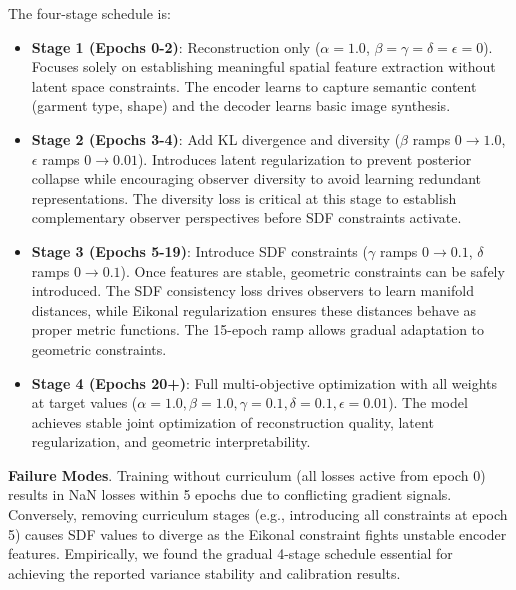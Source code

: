 \documentclass[10pt,twocolumn,letterpaper]{article}
\begin{document}
The four-stage schedule is:

\begin{itemize}
    \item \textbf{Stage 1 (Epochs 0-2)}: Reconstruction only ($\alpha=1.0$, $\beta=\gamma=\delta=\epsilon=0$). Focuses solely on establishing meaningful spatial feature extraction without latent space constraints. The encoder learns to capture semantic content (garment type, shape) and the decoder learns basic image synthesis.

    \item \textbf{Stage 2 (Epochs 3-4)}: Add KL divergence and diversity ($\beta$ ramps $0 \to 1.0$, $\epsilon$ ramps $0 \to 0.01$). Introduces latent regularization to prevent posterior collapse while encouraging observer diversity to avoid learning redundant representations. The diversity loss is critical at this stage to establish complementary observer perspectives before SDF constraints activate.

    \item \textbf{Stage 3 (Epochs 5-19)}: Introduce SDF constraints ($\gamma$ ramps $0 \to 0.1$, $\delta$ ramps $0 \to 0.1$). Once features are stable, geometric constraints can be safely introduced. The SDF consistency loss drives observers to learn manifold distances, while Eikonal regularization ensures these distances behave as proper metric functions. The 15-epoch ramp allows gradual adaptation to geometric constraints.

    \item \textbf{Stage 4 (Epochs 20+)}: Full multi-objective optimization with all weights at target values ($\alpha=1.0, \beta=1.0, \gamma=0.1, \delta=0.1, \epsilon=0.01$). The model achieves stable joint optimization of reconstruction quality, latent regularization, and geometric interpretability.
\end{itemize}

\textbf{Failure Modes}. Training without curriculum (all losses active from epoch 0) results in NaN losses within 5 epochs due to conflicting gradient signals. Conversely, removing curriculum stages (e.g., introducing all constraints at epoch 5) causes SDF values to diverge as the Eikonal constraint fights unstable encoder features. Empirically, we found the gradual 4-stage schedule essential for achieving the reported variance stability and calibration results.
\end{document}
